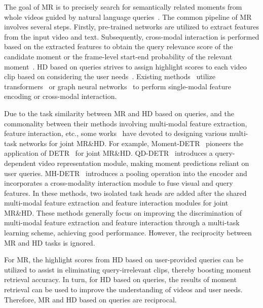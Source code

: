 The goal of MR is to precisely search for semantically related moments from whole videos guided by natural language queries~\cite{DBLP:conf/cvpr/0006XQZT0YZW22}. The common pipeline of MR involves several steps. Firstly, pre-trained networks are utilized to extract features from the input video and text. Subsequently, cross-modal interaction is performed based on the extracted features to obtain the query relevance score of the candidate moment or the frame-level start-end probability of the relevant moment~\cite{DBLP:journals/pami/ZhangSJZ23}. HD based on queries strives to assign highlight scores to each video clip based on considering the user needs~\cite{DBLP:journals/tmm/GuoZJWLY22}. Existing methods~\cite{liu2022umt,xiong2023dual} utilize transformers~\cite{vaswani2017attention} or graph neural networks~\cite{scarselli2008graph} to perform single-modal feature encoding or cross-modal interaction.

Due to the task similarity between MR and HD based on queries, and the commonality between their methods involving multi-modal feature extraction, feature interaction, etc., some works~\cite{lei2021detecting, DBLP:journals/corr/abs-2307-16715} have devoted to designing various multi-task networks for joint MR\&HD. For example, Moment-DETR~\cite{lei2021detecting} pioneers the application of DETR~\cite{DBLP:conf/eccv/CarionMSUKZ20} for joint MR\&HD. QD-DETR~\cite{moon2023query} introduces a query-dependent video representation module, making moment predictions reliant on user queries. MH-DETR~\cite{xu2023mh} introduces a pooling operation into the encoder and incorporates a cross-modality interaction module to fuse visual and query features. In these methods, two isolated task heads are added after the shared multi-modal feature extraction and feature interaction modules for joint MR\&HD.
These methods generally focus on improving the discrimination of multi-modal feature extraction and feature interaction through a multi-task learning scheme, achieving good performance. However, the reciprocity between MR and HD tasks is ignored.

For MR, the highlight scores from HD based on user-provided queries can be utilized to assist in eliminating query-irrelevant clips, thereby boosting moment retrieval accuracy. In turn, for HD based on queries, the results of moment retrieval can be used to improve the understanding of videos and user needs. Therefore, MR and HD based on queries are reciprocal.

